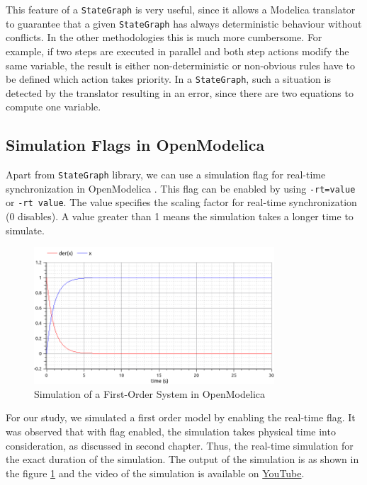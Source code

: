 \documentclass[12pt]{report}
\begin{document}
This feature of a \texttt{StateGraph} is very useful, since it allows a Modelica translator to guarantee that a given \texttt{StateGraph} has always deterministic behaviour without conflicts. In the other methodologies this is much more cumbersome. For example, if two steps are executed in parallel and both step actions modify the same variable, the result is either non-deterministic or non-obvious rules have to be defined which action takes priority. In a \texttt{StateGraph}, such a situation is detected by the translator resulting in an error, since there are two equations to compute one variable. \\

\subsection{Simulation Flags in OpenModelica}
Apart from \texttt{StateGraph} library, we can use a simulation flag for real-time synchronization in OpenModelica \cite{flags}. This flag can be enabled by using \texttt{-rt=value} or \texttt{-rt value}. The value specifies the scaling factor for real-time synchronization (0 disables). A value greater than 1 means the simulation takes a longer time to simulate. 
\begin{figure}[h]
\centering
\includegraphics[width=0.8\textwidth]{images/flag.png}
\caption{Simulation of a First-Order System in OpenModelica}
\label{fig:first-order-rt}
\end{figure}
For our study, we simulated a first order model by enabling the real-time flag. It was observed that with flag enabled, the simulation takes physical time into consideration, as discussed in second chapter. Thus, the real-time simulation for the exact duration of the simulation. The output of the simulation is as shown in the figure \ref{fig:first-order-rt} and the video of the simulation is available on \href{https://youtu.be/s2oELiNWK40}{YouTube}.
\end{document}
